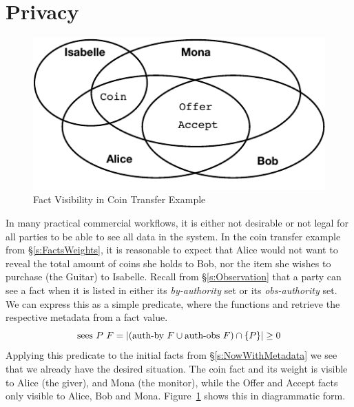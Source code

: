 
\section{Privacy}
\label{s:Privacy}

\begin{figure}
\begin{center}
\includegraphics{figure/coin-transfer-visibility.pdf}
\end{center}
\vspace{-2ex}
\caption{Fact Visibility in Coin Transfer Example}
\label{f:CoinTransferVisibility}
\end{figure}

In many practical commercial workflows, it is either not desirable or not legal for all parties to be able to see all data in the system. In the coin transfer example from \S\ref{s:FactsWeights}, it is reasonable to expect that Alice would not want to reveal the total amount of coins she holds to Bob, nor the item she wishes to purchase (the Guitar) to Isabelle. Recall from \S\ref{s:Observation} that a party can see a fact when it is listed in either its \emph{by-authority} set or its \emph{obs-authority} set. We can express this as a simple predicate, where the functions  and  retrieve the respective metadata from a fact value.
$$
\textrm{sees}~ P~ F = |(\textrm{auth-by}~F \cup \textrm{auth-obs}~F) \cap \{P\}| \ge 0
$$
Applying this predicate to the initial facts from \S\ref{s:NowWithMetadata} we see that we already have the desired situation. The coin fact and its weight is visible to Alice (the giver), and Mona (the monitor), while the Offer and Accept facts only visible to Alice, Bob and Mona. Figure~\ref{f:CoinTransferVisibility} shows this in diagrammatic form.



